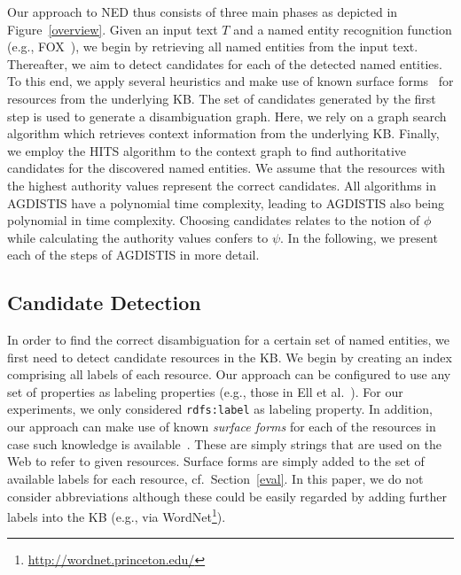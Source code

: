 \documentclass{llncs}
\begin{document}
Our approach to NED thus consists of three main phases as depicted in Figure~\ref{overview}.
Given an input text $T$ and a named entity recognition function (e.g., FOX~\cite{FOX}), we begin by retrieving all named entities from the input text.
Thereafter, we aim to detect candidates for each of the detected named entities.
To this end, we apply several heuristics and make use of known surface forms~\cite{spotlight} for resources from the underlying KB.
The set of candidates generated by the first step is used to generate a disambiguation graph. 
Here, we rely on a graph search algorithm which retrieves context information from the underlying KB. 
Finally, we employ the HITS algorithm to the context graph to find authoritative candidates for the discovered named entities.
We assume that the resources with the highest authority values represent the correct candidates.
All algorithms in AGDISTIS have a polynomial time complexity, leading to AGDISTIS also being polynomial in time complexity.
Choosing candidates relates to the notion of $\phi$ while calculating the authority values confers to $\psi$.
In the following, we present each of the steps of AGDISTIS in more detail.

\subsection{Candidate Detection}\label{choosing}

In order to find the correct disambiguation for a certain set of named entities, we first need to detect candidate resources in the KB. 
We begin by creating an index comprising all labels of each resource.
Our approach can be configured to use any set of properties as labeling properties (e.g., those in Ell et al.~\cite{ELL+11}). 
For our experiments, we only considered \texttt{rdfs:label} as labeling property.
In addition, our approach can make use of known \emph{surface forms} for each of the resources in case such knowledge is available~\cite{spotlight}.
These are simply strings that are used on the Web to refer to given resources.
Surface forms are simply added to the set of available labels for each resource, cf.\ Section~\ref{eval}.
In this paper, we do not consider abbreviations although these could be easily regarded by adding further labels into the KB (e.g., via WordNet\footnote{\url{http://wordnet.princeton.edu/}}).
\end{document}
